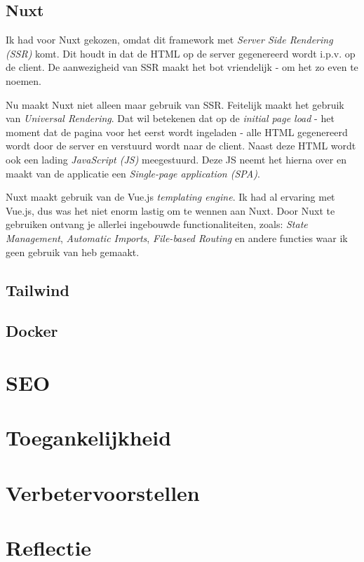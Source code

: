 \documentclass[a4paper]{report}
\begin{document}
    \section{Nuxt}
    Ik had voor Nuxt gekozen, omdat dit framework met \textit{Server Side Rendering (SSR)} komt.
    Dit houdt in dat de HTML op de server gegenereerd wordt i.p.v. op de client. De aanwezigheid van SSR maakt het bot vriendelijk - om het zo even te noemen.

    Nu maakt Nuxt niet alleen maar gebruik van SSR. Feitelijk maakt het gebruik van \textit{Universal Rendering}.
    Dat wil betekenen dat op de \textit{initial page load} - het moment dat de pagina voor het eerst wordt ingeladen - alle HTML gegenereerd wordt door de server
    en verstuurd wordt naar de client. Naast deze HTML wordt ook een lading \textit{JavaScript (JS)} meegestuurd. Deze JS neemt het hierna over en maakt van de applicatie een
    \textit{Single-page application (SPA)}.

    Nuxt maakt gebruik van de Vue.js \textit{templating engine}. Ik had al ervaring met Vue.js, dus was het niet enorm lastig om te wennen aan Nuxt.
    Door Nuxt te gebruiken ontvang je allerlei ingebouwde functionaliteiten, zoals:
    \textit{State Management},
    \textit{Automatic Imports},
    \textit{File-based Routing}
    en andere functies waar ik geen gebruik van heb gemaakt.

    \section{Tailwind}

    \section{Docker}

    \chapter{SEO}

    \chapter{Toegankelijkheid}

    \chapter{Verbetervoorstellen}

    \chapter{Reflectie}

    \printbibliography
\end{document}
